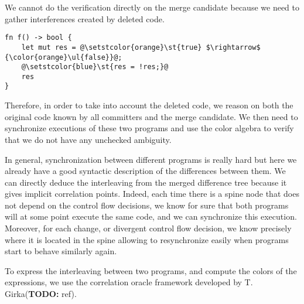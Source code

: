 \documentclass[a4paper,11pt]{article}
\newcommand\todo[1]{{\color{teal}(\textbf{TODO:} #1)}}
\begin{document}
We cannot do the verification directly on the merge candidate because we need to gather interferences created by deleted code.
\begin{lstlisting}[label=lst:del_interference, caption={Example of an ambiguity that would be missed if we don't analyze deleted code.}]
fn f() -> bool {
    let mut res = @\setstcolor{orange}\st{true} $\rightarrow$ {\color{orange}\ul{false}}@;
    @\setstcolor{blue}\st{res = !res;}@
    res
}
\end{lstlisting}

Therefore, in order to take into account the deleted code, we reason on both the original code known by all committers and the merge candidate. We then need to synchronize executions of these two programs and use the color algebra to verify that we do not have any unchecked ambiguity.

In general, synchronization between different programs is really hard but here we already have a good syntactic description of the differences between them. We can directly deduce the interleaving from the merged difference tree because it gives implicit correlation points. Indeed, each time there is a spine node that does not depend on the control flow decisions, we know for sure that both programs will at some point execute the same code, and we can synchronize this execution. Moreover, for each change, or divergent control flow decision, we know precisely  where it is located in the spine allowing to resynchronize easily when programs start to behave similarly again.

To express the interleaving between two programs, and compute the colors of the expressions, we use the correlation oracle framework developed by T. Girka\todo{ref}.
\end{document}
